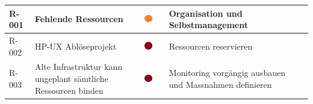 \begin{table}[H]
{\begin{tabular}{lllllll}
R-001                                                                       & Fehlende Ressourcen                                                                                & \multicolumn{1}{c}{{\includegraphics[width=0.05\linewidth]{source/status_report/main/risk_warning}}} &                         & Organisation und Selbstmanagement                                                                                                                            &                                                                                                                                                              &                                                                                                                               \\ \hline
R-002                                                                       & HP-UX Ablöseprojekt                                                                                & {\includegraphics[width=0.05\linewidth]{source/status_report/main/risk_alert}}                       &                         & Ressourcen reservieren                                                                                                                                       &                                                                                                                                                              &                                                                                                                               \\ \hline
R-003                                                                       & Alte Infrastruktur kann ungeplant sämtliche Ressourcen binden                                      & {\includegraphics[width=0.05\linewidth]{source/status_report/main/risk_alert}}                       &                         & Monitoring vorgängig ausbauen und Massnahmen definieren                                                                                                      &                                                                                                                                                              &                                                                                                                               \\ \hline

\end{tabular}}
\end{table}
